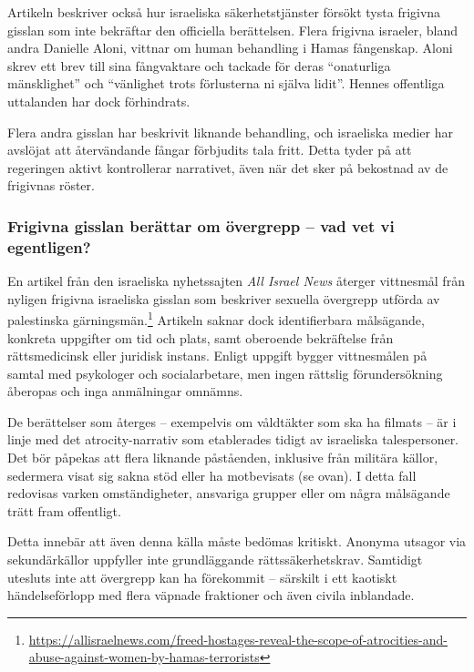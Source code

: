 Artikeln beskriver också hur israeliska säkerhetstjänster försökt tysta frigivna gisslan som inte bekräftar den officiella berättelsen. Flera frigivna israeler, bland andra Danielle Aloni, vittnar om human behandling i Hamas fångenskap. Aloni skrev ett brev till sina fångvaktare och tackade för deras “onaturliga mänsklighet” och “vänlighet trots förlusterna ni själva lidit”. Hennes offentliga uttalanden har dock förhindrats.

Flera andra gisslan har beskrivit liknande behandling, och israeliska medier har avslöjat att återvändande fångar förbjudits tala fritt. Detta tyder på att regeringen aktivt kontrollerar narrativet, även när det sker på bekostnad av de frigivnas röster.

\subsubsection*{Frigivna gisslan berättar om övergrepp – vad vet vi egentligen?}

En artikel från den israeliska nyhetssajten \textit{All Israel News} återger vittnesmål från nyligen frigivna israeliska gisslan som beskriver sexuella övergrepp utförda av palestinska gärningsmän.\footnote{\url{https://allisraelnews.com/freed-hostages-reveal-the-scope-of-atrocities-and-abuse-against-women-by-hamas-terrorists}} Artikeln saknar dock identifierbara målsägande, konkreta uppgifter om tid och plats, samt oberoende bekräftelse från rättsmedicinsk eller juridisk instans. Enligt uppgift bygger vittnesmålen på samtal med psykologer och socialarbetare, men ingen rättslig förundersökning åberopas och inga anmälningar omnämns.

De berättelser som återges – exempelvis om våldtäkter som ska ha filmats – är i linje med det atrocity-narrativ som etablerades tidigt av israeliska talespersoner. Det bör påpekas att flera liknande påståenden, inklusive från militära källor, sedermera visat sig sakna stöd eller ha motbevisats (se ovan). I detta fall redovisas varken omständigheter, ansvariga grupper eller om några målsägande trätt fram offentligt.

Detta innebär att även denna källa måste bedömas kritiskt. Anonyma utsagor via sekundärkällor uppfyller inte grundläggande rättssäkerhetskrav. Samtidigt utesluts inte att övergrepp kan ha förekommit – särskilt i ett kaotiskt händelseförlopp med flera väpnade fraktioner och även civila inblandade. 

